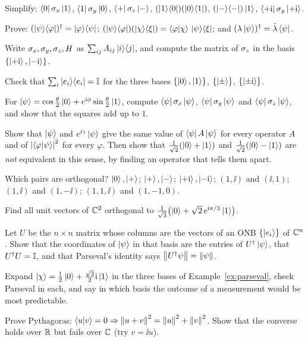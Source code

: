 \begin{exerciseset}
   Simplify: $\bra0\sx\ket1$, $\bra1\sy\ket0$, $\bra+\sz\ket-$, $(\ket1\!\bra0)(\ket0\!\bra1)$, $(\ket-\!\bra-)\ket1$, $\bra{+\ii}\sy\ket{+\ii}$.

   Prove: $(\ket\psi\!\bra\varphi)^\dagger=\ket\varphi\!\bra\psi$; $(\ket\psi\!\bra\varphi)(\ket\chi\!\bra\xi)=\braket\varphi\chi\,\ket\psi\!\bra\xi$; and $(\lambda\ket\psi)^\dagger=\bar\lambda\bra\psi$.

   Write $\sx,\sy,\sz,H$ as $\sum_{ij}A_{ij}\ket i\!\bra j$, and compute the matrix of $\sz$ in the basis $\{\ket{+\ii},\ket{-\ii}\}$.

   Check that $\sum_i\ket{e_i}\!\bra{e_i}=\Id$ for the three bases $\{\ket0,\ket1\}$, $\{\ket\pm\}$, $\{\ket{\pm\ii}\}$.

   For $\ket\psi=\cos\frac\theta2\ket0+e^{\ii\phi}\sin\frac\theta2\ket1$, compute $\bra\psi\sx\ket\psi$, $\bra\psi\sy\ket\psi$ and $\bra\psi\sz\ket\psi$, and show that the squares add up to $1$.

   Show that $\ket\psi$ and $e^{\ii\gamma}\ket\psi$ give the same value of $\bra\psi A\ket\psi$ for every operator $A$ and of $\abs{\braket\varphi\psi}^2$ for every $\varphi$. Then show that $\frac1{\sqrt2}(\ket0+\ket1)$ and $\frac1{\sqrt2}(\ket0-\ket1)$ are \emph{not} equivalent in this sense, by finding an operator that tells them apart.

   Which pairs are orthogonal? $\ket0,\ket+$; $\ket+,\ket-$; $\ket{+\ii},\ket{-\ii}$; $(1,\ii)$ and $(\ii,1)$; $(1,\ii)$ and $(1,-\ii)$; $(1,1,\ii)$ and $(1,-1,0)$.

   Find all unit vectors of $\C^2$ orthogonal to $\frac1{\sqrt3}\bigl(\ket0+\sqrt2\,e^{\ii\pi/3}\ket1\bigr)$.

   Let $U$ be the $n\times n$ matrix whose columns are the vectors of an ONB $\{\ket{e_i}\}$ of $\C^n$. Show that the coordinates of $\ket\psi$ in that basis are the entries of $U^\dagger\ket\psi$, that $U^\dagger U=\Id$, and that Parseval's identity says $\norm{U^\dagger\psi}=\norm\psi$.

   Expand $\ket\chi=\tfrac12\ket0+\tfrac{\sqrt3}{2}\ii\ket1$ in the three bases of Example~\ref{ex:parseval}, check Parseval in each, and say in which basis the outcome of a measurement would be most predictable.

   Prove Pythagoras: $\braket uv=0\Rightarrow\norm{u+v}^2=\norm u^2+\norm v^2$. Show that the converse holds over $\R$ but fails over $\C$ (try $v=\ii u$).


\end{exerciseset}
